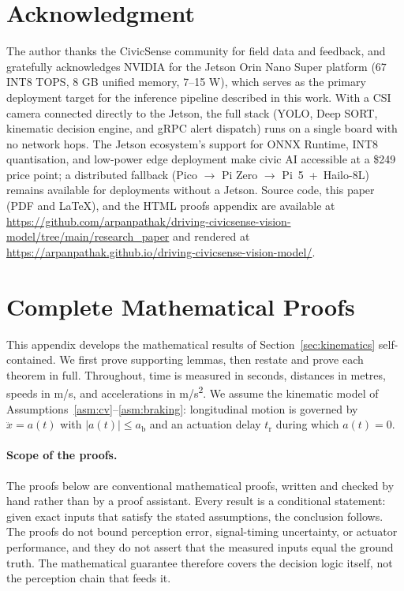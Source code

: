 \documentclass[conference, a4paper]{IEEEtran}
\theoremstyle{plain}
\newcommand{\ab}{a_{\mathrm{b}}}
\newcommand{\tr}{t_{\mathrm{r}}}
\begin{document}
\section*{Acknowledgment}
The author thanks the CivicSense community for field data and feedback,
and gratefully acknowledges NVIDIA for the Jetson Orin Nano Super
platform (67 INT8 TOPS, 8 GB unified memory, 7--15 W), which serves as
the primary deployment target for the inference pipeline described in
this work. With a CSI camera connected directly to the Jetson, the
full stack (YOLO, Deep SORT, kinematic decision engine, and gRPC alert
dispatch) runs on a single board with no network hops. The Jetson
ecosystem's support for ONNX Runtime, INT8 quantisation, and low-power
edge deployment make civic AI accessible at a \$249 price point;
a distributed fallback (Pico $\rightarrow$ Pi Zero $\rightarrow$
Pi~5~+~Hailo-8L) remains available for deployments without a Jetson.
Source code, this paper (PDF and \LaTeX{}), and the HTML proofs appendix are
available at
\url{https://github.com/arpanpathak/driving-civicsense-vision-model/tree/main/research_paper}
and rendered at
\url{https://arpanpathak.github.io/driving-civicsense-vision-model/}.

\appendices
\section{Complete Mathematical Proofs}
\label{app:proofs}

This appendix develops the mathematical results of Section~\ref{sec:kinematics}
self-contained. We first prove supporting lemmas, then restate and prove each
theorem in full. Throughout, time is measured in seconds, distances in
metres, speeds in \si{m/s}, and accelerations in \si{m/s^2}. We assume the
kinematic model of Assumptions~\ref{asm:cv}--\ref{asm:braking}: longitudinal
motion is governed by $\ddot{x} = a(t)$ with $|a(t)| \leq \ab$ and an
actuation delay $\tr$ during which $a(t) = 0$.

\paragraph{Scope of the proofs.}
The proofs below are conventional mathematical proofs, written and checked
by hand rather than by a proof assistant. Every result is a conditional
statement: given exact inputs that
satisfy the stated assumptions, the conclusion follows. The proofs do not
bound perception error, signal-timing uncertainty, or actuator performance,
and they do not assert that the measured inputs equal the ground truth. The
mathematical guarantee therefore covers the decision logic itself, not the
perception chain that feeds it.
\end{document}
